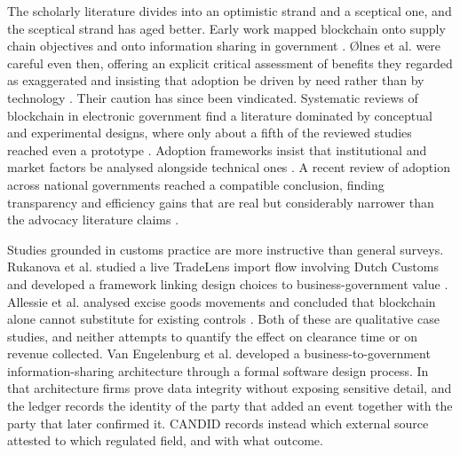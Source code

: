 \documentclass[information,article,submit,moreauthors]{Definitions/mdpi}
\begin{document}
The scholarly literature divides into an optimistic strand and a sceptical one, and the sceptical strand has aged better. Early work mapped blockchain onto supply chain objectives and onto information sharing in government \cite{kshetri2018roles,olnes2017government}. \O lnes et al. were careful even then, offering an explicit critical assessment of benefits they regarded as exaggerated and insisting that adoption be driven by need rather than by technology \cite{olnes2017government}. Their caution has since been vindicated. Systematic reviews of blockchain in electronic government find a literature dominated by conceptual and experimental designs, where only about a fifth of the reviewed studies reached even a prototype \cite{lykidis2021egov}. Adoption frameworks insist that institutional and market factors be analysed alongside technical ones \cite{janssen2020framework}. A recent review of adoption across national governments reached a compatible conclusion, finding transparency and efficiency gains that are real but considerably narrower than the advocacy literature claims \cite{almiani2026government}.

Studies grounded in customs practice are more instructive than general surveys. Rukanova et al. studied a live TradeLens import flow involving Dutch Customs and developed a framework linking design choices to business-government value \cite{rukanova2021tradelens}. Allessie et al. analysed excise goods movements and concluded that blockchain alone cannot substitute for existing controls \cite{allessie2019excise}. Both of these are qualitative case studies, and neither attempts to quantify the effect on clearance time or on revenue collected. Van Engelenburg et al. \cite{vanengelenburg2019b2g} developed a business-to-government information-sharing architecture through a formal software design process. In that architecture firms prove data integrity without exposing sensitive detail, and the ledger records the identity of the party that added an event together with the party that later confirmed it. CANDID records instead which external source attested to which regulated field, and with what outcome.
\end{document}
